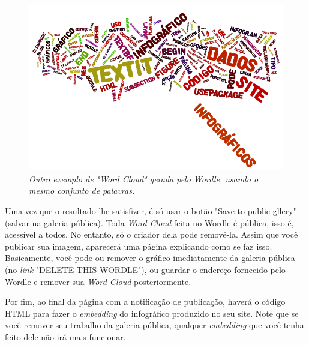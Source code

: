 \documentclass[12pt,onecolumn]{article}
\begin{document}
    \begin{figure}[ht]
      \centering
      \includegraphics[width=.9\linewidth]{wordle-2.png}
      \caption{
        \footnotesize
        \it
        Outro exemplo de "Word Cloud" gerada pelo Wordle, usando o mesmo
        conjunto de palavras.
      }
      \label{fig:wordle-2}
    \end{figure}
    
    Uma vez que o resultado lhe satisfizer, é só usar o botão "Save to public
    gllery" (salvar na galeria pública). Toda \textit{Word Cloud} feita no
    Wordle é pública, isso é, acessível a todos. No entanto, só o criador dela
    pode removê-la. Assim que você publicar sua imagem, aparecerá uma página
    explicando como se faz isso. Basicamente, você pode ou remover o gráfico
    imediatamente da galeria pública (no \textit{link} "DELETE THIS WORDLE"), ou
    guardar o endereço fornecido pelo Wordle e remover sua \textit{Word Cloud}
    posteriormente.
    
    Por fim, ao final da página com a notificação de publicação, haverá o código
    HTML para fazer o \textit{embedding} do infográfico produzido no seu site.
    Note que se você remover seu trabalho da galeria pública, qualquer
    \textit{embedding} que você tenha feito dele não irá mais funcionar.
\end{document}
